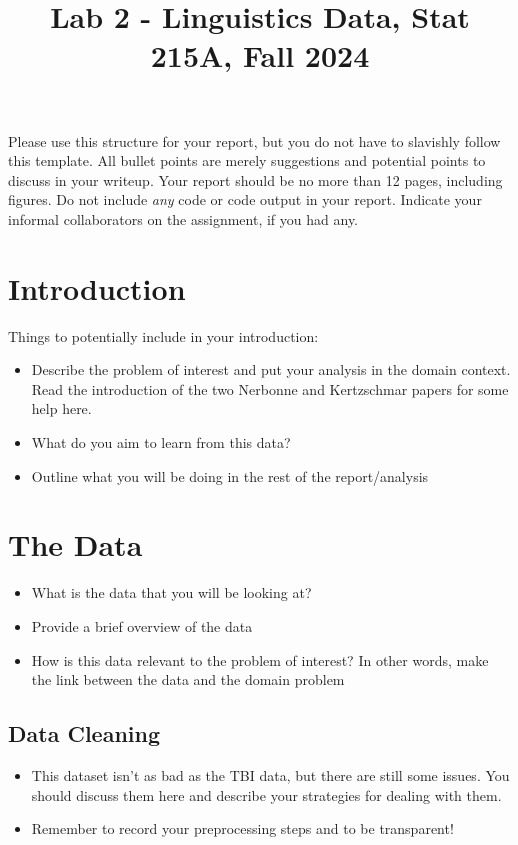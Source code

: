 \documentclass[10pt,letterpaper]{article}
\title{Lab 2 - Linguistics Data, Stat 215A, Fall 2024\vspace{-2em}}
\begin{document}
\maketitle

Please use this structure for your report, but you do not have to slavishly follow this template. All bullet points are merely suggestions and potential points to discuss in your writeup. Your report should be no more than 12 pages, including figures. Do not include \emph{any} code or code output in your report. Indicate your informal collaborators on the assignment, if you had any.

\section{Introduction}\label{introduction}

Things to potentially include in your introduction:

\begin{itemize}
\item Describe the problem of interest and put your analysis in the domain context. Read the introduction of the two Nerbonne and Kertzschmar papers for some help here.
\item What do you aim to learn from this data?
\item Outline what you will be doing in the rest of the report/analysis
\end{itemize}


\section{The Data}\label{data}

\begin{itemize}
\item What is the data that you will be looking at?
\item Provide a brief overview of the data
\item How is this data relevant to the problem of interest? In other words, make the link between the data and the domain problem

\end{itemize}

\subsection{Data Cleaning}\label{data-cleaning}

\begin{itemize}
\item This dataset isn't as bad as the TBI data, but there are still some issues. You should discuss them here and describe your strategies for dealing with them.
\item Remember to record your preprocessing steps and to be transparent!
\end{itemize}
\end{document}
